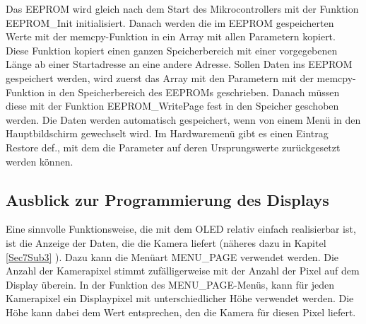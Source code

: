 Das \ac{EEPROM} wird gleich nach dem Start des Mikrocontrollers mit der Funktion \glqq EEPROM\_Init\grqq{} initialisiert. Danach werden die im \ac{EEPROM} gespeicherten Werte  mit der \glqq memcpy\grqq -Funktion in ein Array mit allen Parametern kopiert. Diese Funktion kopiert einen ganzen Speicherbereich mit einer vorgegebenen Länge ab einer Startadresse an eine andere Adresse. Sollen Daten ins \ac{EEPROM} gespeichert werden, wird zuerst das Array mit den Parametern mit der \glqq memcpy\grqq -Funktion in den Speicherbereich des \acp{EEPROM} geschrieben. Danach müssen diese mit der Funktion \glqq EEPROM\_WritePage\grqq{} fest in den Speicher geschoben werden. Die Daten werden automatisch gespeichert, wenn von einem Menü in den Hauptbildschirm gewechselt wird. Im Hardwaremenü gibt es einen Eintrag \glqq Restore def.\grqq , mit dem die Parameter auf deren Ursprungswerte zurückgesetzt werden können.

\subsection{Ausblick zur Programmierung des Displays}\label{sec:DispAusblick}
Eine sinnvolle Funktionsweise, die mit dem \ac{OLED} relativ einfach realisierbar ist, ist die Anzeige der Daten, die die Kamera liefert (näheres dazu in Kapitel \ref{Sec7Sub3} \glqq{}\grqq{}). Dazu kann die Menüart \glqq MENU\_PAGE\grqq{} verwendet werden. Die Anzahl der Kamerapixel stimmt zufälligerweise mit der Anzahl der Pixel auf dem Display überein. In der Funktion des \glqq MENU\_PAGE\grqq -Menüs, kann für jeden Kamerapixel ein Displaypixel mit unterschiedlicher Höhe verwendet werden. Die Höhe kann dabei dem Wert entsprechen, den die Kamera für diesen Pixel liefert.
\newpage